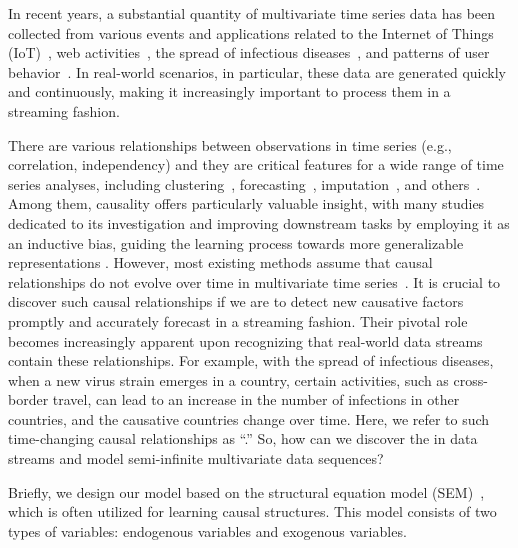 In recent years,
a substantial quantity of multivariate time series data
has been collected from various events and applications
related to the Internet of Things (IoT)~\cite{de2016iot,mahdavinejad2018machine},
web activities~\cite{kawabata2020non,nakamura2023fast},
the spread of infectious diseases~\cite{kimura2022fast}, and
patterns of user behavior~\cite{matsubara2012fast}.
In real-world scenarios, in particular,
these data are generated quickly and continuously, making it increasingly important to process them in a streaming fashion.
\par
There are various relationships between observations
in time series (e.g., correlation, independency)
and they are critical features for a wide range of time series analyses,
including clustering~\cite{hallac2017toeplitz, obata2024dynamic}, forecasting~\cite{Yuqietal-2023-PatchTST}, imputation~\cite{wang2023networked}, and others~\cite{tozzo2021statistical}.
Among them, causality
\cite{bollen1989structural, spirtes2000causation}
offers particularly valuable insight,
with many studies dedicated to its investigation
\cite{he2021daring, fujiwara2023causal}
and improving downstream tasks by employing it as an inductive bias, guiding the learning process towards more generalizable representations
\cite{dai2022graph, cheng2023cuts}.
However, most existing methods assume that causal relationships do not evolve over time in multivariate time series~\cite{runge2018causal}.
It is crucial to discover such causal relationships
if we are to detect new causative factors promptly
and accurately forecast in a streaming fashion.
Their pivotal role becomes increasingly apparent upon
recognizing that real-world data streams contain these relationships.
For example,
with the spread of infectious diseases,
when a new virus strain emerges in a country,
certain activities, such as cross-border travel,
can lead to an increase in the number of infections in other countries,
and the causative countries change over time.
Here, we refer to such time-changing causal relationships as ``\textit{\relation}.''
So, how can we discover the \relation in data streams and 
model semi-infinite multivariate data sequences?
\par
Briefly, we design our model based on the structural equation model (SEM)~\cite{pearl2009causality}, 
which is often utilized for learning causal structures.
This model consists of two types of variables:
endogenous variables and exogenous variables.
